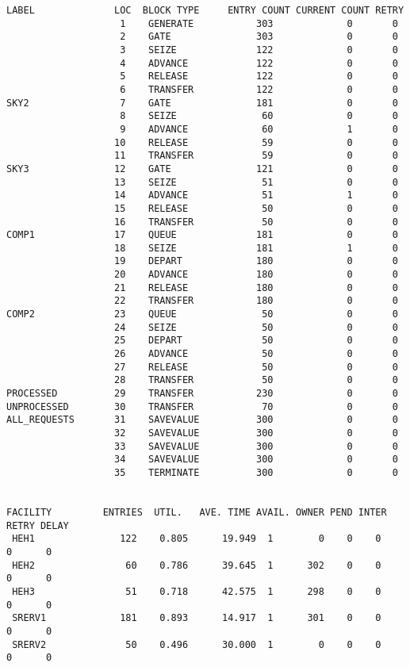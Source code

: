 \begin{lstlisting}[caption={отчет}]
 LABEL              LOC  BLOCK TYPE     ENTRY COUNT CURRENT COUNT RETRY
                    1    GENERATE           303             0       0
                    2    GATE               303             0       0
                    3    SEIZE              122             0       0
                    4    ADVANCE            122             0       0
                    5    RELEASE            122             0       0
                    6    TRANSFER           122             0       0
SKY2                7    GATE               181             0       0
                    8    SEIZE               60             0       0
                    9    ADVANCE             60             1       0
                   10    RELEASE             59             0       0
                   11    TRANSFER            59             0       0
SKY3               12    GATE               121             0       0
                   13    SEIZE               51             0       0
                   14    ADVANCE             51             1       0
                   15    RELEASE             50             0       0
                   16    TRANSFER            50             0       0
COMP1              17    QUEUE              181             0       0
                   18    SEIZE              181             1       0
                   19    DEPART             180             0       0
                   20    ADVANCE            180             0       0
                   21    RELEASE            180             0       0
                   22    TRANSFER           180             0       0
COMP2              23    QUEUE               50             0       0
                   24    SEIZE               50             0       0
                   25    DEPART              50             0       0
                   26    ADVANCE             50             0       0
                   27    RELEASE             50             0       0
                   28    TRANSFER            50             0       0
PROCESSED          29    TRANSFER           230             0       0
UNPROCESSED        30    TRANSFER            70             0       0
ALL_REQUESTS       31    SAVEVALUE          300             0       0
                   32    SAVEVALUE          300             0       0
                   33    SAVEVALUE          300             0       0
                   34    SAVEVALUE          300             0       0
                   35    TERMINATE          300             0       0


FACILITY         ENTRIES  UTIL.   AVE. TIME AVAIL. OWNER PEND INTER RETRY DELAY
 HEH1               122    0.805      19.949  1        0    0    0     0      0
 HEH2                60    0.786      39.645  1      302    0    0     0      0
 HEH3                51    0.718      42.575  1      298    0    0     0      0
 SRERV1             181    0.893      14.917  1      301    0    0     0      0
 SRERV2              50    0.496      30.000  1        0    0    0     0      0



\end{lstlisting}
